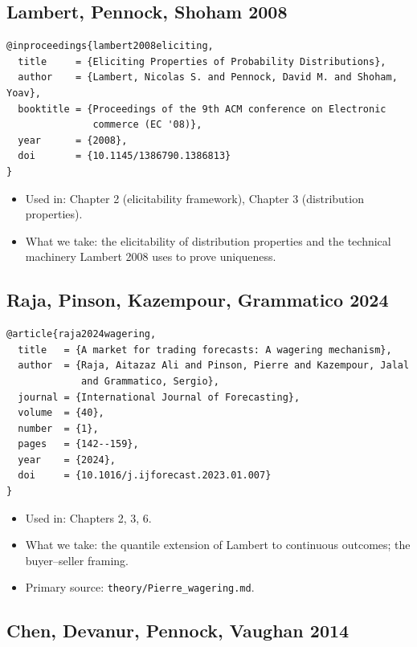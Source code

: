 \documentclass[11pt,a4paper,openany]{report}
\begin{document}
\subsection{Lambert, Pennock, Shoham 2008}

\begin{verbatim}
@inproceedings{lambert2008eliciting,
  title     = {Eliciting Properties of Probability Distributions},
  author    = {Lambert, Nicolas S. and Pennock, David M. and Shoham, Yoav},
  booktitle = {Proceedings of the 9th ACM conference on Electronic
               commerce (EC '08)},
  year      = {2008},
  doi       = {10.1145/1386790.1386813}
}
\end{verbatim}

\begin{itemize}
  \item Used in: Chapter 2 (elicitability framework), Chapter 3 (distribution
    properties).
  \item What we take: the elicitability of distribution properties and the
    technical machinery Lambert 2008 uses to prove uniqueness.
\end{itemize}

\subsection{Raja, Pinson, Kazempour, Grammatico 2024}

\begin{verbatim}
@article{raja2024wagering,
  title   = {A market for trading forecasts: A wagering mechanism},
  author  = {Raja, Aitazaz Ali and Pinson, Pierre and Kazempour, Jalal
             and Grammatico, Sergio},
  journal = {International Journal of Forecasting},
  volume  = {40},
  number  = {1},
  pages   = {142--159},
  year    = {2024},
  doi     = {10.1016/j.ijforecast.2023.01.007}
}
\end{verbatim}

\begin{itemize}
  \item Used in: Chapters 2, 3, 6.
  \item What we take: the quantile extension of Lambert to continuous
    outcomes; the buyer–seller framing.
  \item Primary source: \texttt{theory/Pierre\_wagering.md}.
\end{itemize}

\subsection{Chen, Devanur, Pennock, Vaughan 2014}
\end{document}
